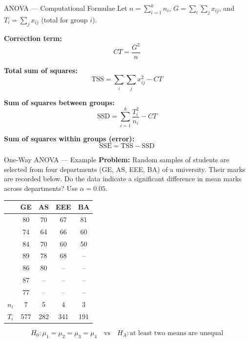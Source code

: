 \documentclass[12pt, aspectratio=169]{beamer}
\begin{document}
    \begin{frame}{ANOVA --- Computational Formulae}
        Let $n = \sum_{i=1}^k n_i$, $G = \sum_i \sum_j x_{ij}$,
        and $T_i = \sum_j x_{ij}$ (total for group $i$).

        \vspace{0.5em}

        \textbf{Correction term:}
        \[
            CT = \frac{G^2}{n}
        \]

        \textbf{Total sum of squares:}
        \[
            \text{TSS} = \sum_i \sum_j x_{ij}^2 - CT
        \]

        \textbf{Sum of squares between groups:}
        \[
            \text{SSD} = \sum_{i=1}^{k} \frac{T_i^2}{n_i} - CT
        \]

        \textbf{Sum of squares within groups (error):}
        \[
            \text{SSE} = \text{TSS} - \text{SSD}
        \]
    \end{frame}


    \begin{frame}{One-Way ANOVA --- Example}
        \textbf{Problem:} Random samples of students are selected from four
        departments (GE, AS, EEE, BA) of a university. Their marks are recorded
        below. Do the data indicate a significant difference in mean marks across
        departments? Use $\alpha = 0.05$.

        \begin{center}
            \small
            \begin{tabular}{ccccc}
                \hline
                & \textbf{GE} & \textbf{AS} & \textbf{EEE} & \textbf{BA} \\
                \hline
                & 80 & 70 & 67 & 81 \\
                & 74 & 64 & 66 & 60 \\
                & 84 & 70 & 60 & 50 \\
                & 89 & 78 & 68 & -- \\
                & 86 & 80 & -- & -- \\
                & 87 & -- & -- & -- \\
                & 77 & -- & -- & -- \\
                \hline
                $n_i$ & 7 & 5 & 4 & 3 \\
                $T_i$ & 577 & 282 & 341 & 191 \\
                \hline
            \end{tabular}
        \end{center}

        \[
            H_0: \mu_1 = \mu_2 = \mu_3 = \mu_4
            \quad \text{vs} \quad
            H_A: \text{at least two means are unequal}
        \]
    \end{frame}
\end{document}
